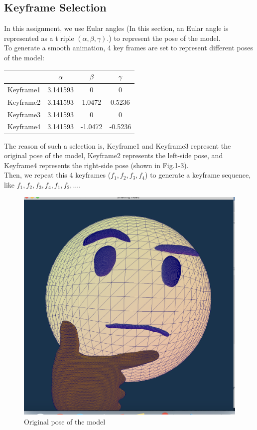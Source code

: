 \documentclass[acmtog]{acmart}
\begin{document}
\subsection{Keyframe Selection}
In this assignment, we use Eular angles (In this section, an Eular angle is represented as a t
riple $(\alpha, \beta, \gamma)$.) to represent the pose of the model. \\
To generate a smooth animation, 4 key frames are set to represent different poses of the model:
\begin{table}[h]
	\begin{tabular}{|c|c|c|c|}
		\hline
		 & $\alpha$ & $\beta$ & $\gamma$\\
		\hline
		Keyframe1 & 3.141593 & 0 & 0\\
		\hline
		Keyframe2 & 3.141593 & 1.0472 & 0.5236\\
		\hline
		Keyframe3 & 3.141593 & 0 & 0\\
		\hline
		Keyframe4 & 3.141593 & -1.0472 & -0.5236\\
		\hline
	\end{tabular}
\end{table}
The reason of such a selection is, Keyframe1 and Keyframe3 represent the original pose of the model, 
Keyframe2 represents the left-side pose, and Keyframe4 represents the right-side pose (shown in Fig.1-3).\\
Then, we repeat this 4 keyframes ($f_1, f_2, f_3, f_4$) to generate a keyframe sequence, like 
$f_1, f_2, f_3, f_4, f_1, f_2, \ldots$. 
\begin{figure}[h]
	\begin{center}
		\includegraphics[scale=0.17]{origin.png}
	\end{center}
	\caption{Original pose of the model}
\end{figure}
\end{document}
